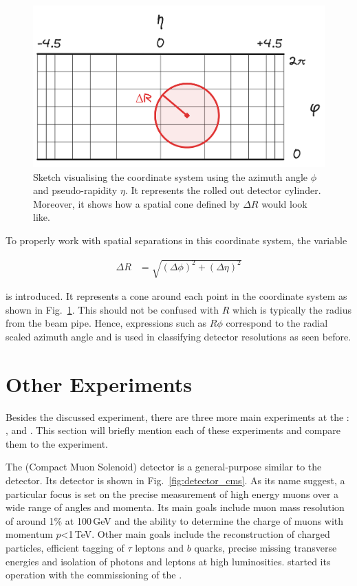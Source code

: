 \documentclass[bachelor,ngerman,english]{GAUBM}
\begin{document}
\begin{figure}[t]
    \centering
    \includegraphics[width=.80\textwidth]{figures/lhc/atlas_coordinate_system.excalidraw.png}
    \caption{Sketch visualising the \atlas coordinate system using the azimuth angle $\phi$ and pseudo-rapidity $\eta$. It represents the rolled out detector cylinder. Moreover, it shows how a spatial cone defined by $\Delta R$ would look like.}
    \label{fig:atlas_coordinate_system}
\end{figure}

To properly work with spatial separations in this coordinate system, the variable

\begin{align}
    \Delta R &= \sqrt{\left(\Delta \phi\right)^2 + \left(\Delta \eta\right)^2}\label{eq:delta_r}
\end{align} 

is introduced. It represents a cone around each point in the coordinate system as shown in Fig.~\ref{fig:atlas_coordinate_system}. This should not be confused with $R$ which is typically the radius from the beam pipe. Hence, expressions such as $R\phi$ correspond to the radial scaled azimuth angle and is used in classifying detector resolutions as seen before.

\section{Other Experiments}
\label{sec:exp:other_experiments}
Besides the discussed \atlas experiment, there are three more main experiments at the \lhc: \cms, \alice and \lhcb. This section will briefly mention each of these experiments and compare them to the \atlas experiment.

The \cms (Compact Muon Solenoid) \cite{other:cms} detector is a general-purpose similar to the \atlas detector. Its detector is shown in Fig.~\ref{fig:detector_cms}. As its name suggest, a particular focus is set on the precise measurement of high energy muons over a wide range of angles and momenta. Its main goals include muon mass resolution of around 1\% at 100\,GeV and the ability to determine the charge of muons with momentum $p$<1\,TeV. Other main goals include the reconstruction of charged particles, efficient tagging of $\tau$ leptons and $b$ quarks, precise missing transverse energies and isolation of photons and leptons at high luminosities. \cms started its operation with the commissioning of the \lhc.
\end{document}
